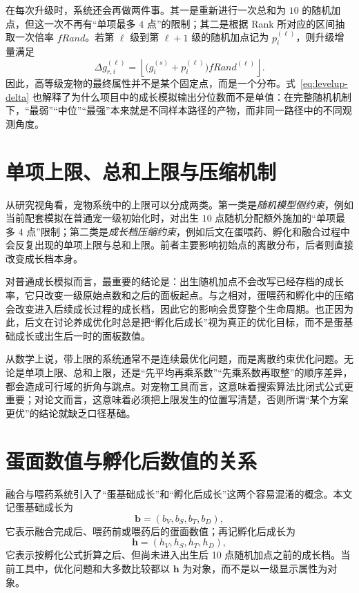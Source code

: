 在每次升级时，系统还会再做两件事。其一是重新进行一次总和为 $10$ 的随机加点，但这一次不再有“单项最多 $4$ 点”的限制；其二是根据 Rank 所对应的区间抽取一次倍率 $fRand$。若第 $\ell$ 级到第 $\ell+1$ 级的随机加点记为 $p_i^{(\ell)}$，则升级增量满足
\begin{equation}
    \Delta g_{r,i}^{(\ell)} = \left\lfloor \bigl(g_i^{(s)} + p_i^{(\ell)}\bigr) fRand^{(\ell)} \right\rfloor.
    \label{eq:levelup-delta}
\end{equation}
因此，高等级宠物的最终属性并不是某个固定点，而是一个分布。式~\eqref{eq:levelup-delta} 也解释了为什么项目中的成长模拟输出分位数而不是单值：在完整随机机制下，“最弱”“中位”“最强”本来就是不同样本路径的产物，而非同一路径中的不同观测角度。

\section{单项上限、总和上限与压缩机制}

从研究视角看，宠物系统中的上限可以分成两类。第一类是\emph{随机模型侧约束}，例如当前配套模拟在普通宠一级初始化时，对出生 $10$ 点随机分配额外施加的“单项最多 $4$ 点”限制；第二类是\emph{成长档压缩约束}，例如后文在蛋喂药、孵化和融合过程中会反复出现的单项上限与总和上限。前者主要影响初始点的离散分布，后者则直接改变成长档本身。

对普通成长模拟而言，最重要的结论是：出生随机加点不会改写已经存档的成长率，它只改变一级原始点数和之后的面板起点。与之相对，蛋喂药和孵化中的压缩会改变进入后续成长过程的成长档，因此它的影响会贯穿整个生命周期。也正因为此，后文在讨论养成优化时总是把“孵化后成长”视为真正的优化目标，而不是蛋基础成长或出生后一时的面板数值。

从数学上说，带上限的系统通常不是连续最优化问题，而是离散约束优化问题。无论是单项上限、总和上限，还是“先平均再乘系数”“先乘系数再取整”的顺序差异，都会造成可行域的折角与跳点。对宠物工具而言，这意味着搜索算法比闭式公式更重要；对论文而言，这意味着必须把上限发生的位置写清楚，否则所谓“某个方案更优”的结论就缺乏口径基础。

\section{蛋面数值与孵化后数值的关系}

融合与喂药系统引入了“蛋基础成长”和“孵化后成长”这两个容易混淆的概念。本文记蛋基础成长为
\begin{equation}
    \bm{b}=(b_V,b_S,b_T,b_D),
\end{equation}
它表示融合完成后、喂药前或喂药后的蛋面数值；再记孵化后成长为
\begin{equation}
    \bm{h}=(h_V,h_S,h_T,h_D),
\end{equation}
它表示按孵化公式折算之后、但尚未进入出生后 10 点随机加点之前的成长档。当前工具中，优化问题和大多数比较都以 $\bm{h}$ 为对象，而不是以一级显示属性为对象。

